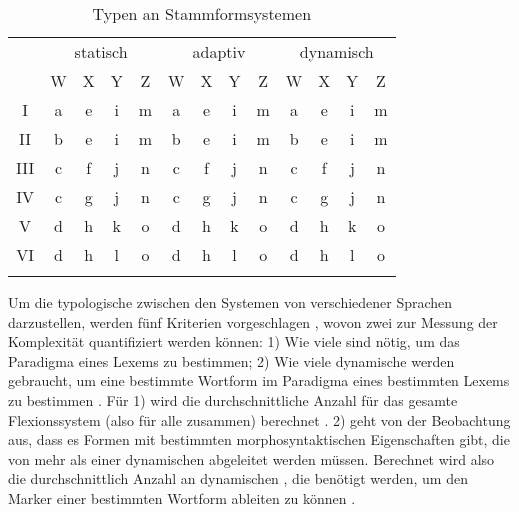 \begin{exe}
\begin{exe}
\begin{description}
\begin{table}
\caption{Typen an Stammformsystemen \citep[2-4]{FinkelStump2007}}\label{table4.14}
\begin{tabular}{*{13}{c}}
\lsptoprule
& \multicolumn{4}{c}{statisch} & \multicolumn{4}{c}{adaptiv} & \multicolumn{4}{c}{dynamisch}\\\cmidrule(lr){2-5}\cmidrule(lr){6-9}\cmidrule(lr){10-13}
& W & X & Y & Z & W & X & Y & Z & W & X & Y & Z\\\midrule
I & \cellcolor[gray]{0.9}a & \cellcolor[gray]{0.9}e & \cellcolor[gray]{0.9}i & m & \cellcolor[gray]{0.9}a & e & i & m & \cellcolor[gray]{0.9}a & e & i & m\\
\midrule
II & \cellcolor[gray]{0.9}b & \cellcolor[gray]{0.9}e & \cellcolor[gray]{0.9}i & m & \cellcolor[gray]{0.9}b & e & i & m & \cellcolor[gray]{0.9}b & e & i & m\\
\midrule
III & \cellcolor[gray]{0.9}c & \cellcolor[gray]{0.9}f & \cellcolor[gray]{0.9}j & n & \cellcolor[gray]{0.9}c & \cellcolor[gray]{0.9}f & j & n & c & \cellcolor[gray]{0.9}f & j & n\\
\midrule
IV & \cellcolor[gray]{0.9}c & \cellcolor[gray]{0.9}g & \cellcolor[gray]{0.9}j & n & \cellcolor[gray]{0.9}c & \cellcolor[gray]{0.9}g & j & n & c & \cellcolor[gray]{0.9}g & j & n\\
\midrule
V & \cellcolor[gray]{0.9}d & \cellcolor[gray]{0.9}h & \cellcolor[gray]{0.9}k & o & \cellcolor[gray]{0.9}d & h & \cellcolor[gray]{0.9}k & o & d & h & \cellcolor[gray]{0.9}k & o\\
\midrule
VI & \cellcolor[gray]{0.9}d & \cellcolor[gray]{0.9}h & \cellcolor[gray]{0.9}l & o & \cellcolor[gray]{0.9}d & h & \cellcolor[gray]{0.9}l & o & d & h & \cellcolor[gray]{0.9}l & o\\
\lspbottomrule
\end{tabular}
\end{table}

Um die typologische  zwischen den Systemen von  verschiedener Sprachen darzustellen, werden fünf Kriterien vorgeschlagen \citep[9]{FinkelStump2007}, wovon zwei zur Messung der Komplexität quantifiziert werden können: 1) Wie viele  sind nötig, um das Paradigma eines Lexems zu bestimmen; 2) Wie viele dynamische  werden gebraucht, um eine bestimmte Wortform im Paradigma eines bestimmten Lexems zu bestimmen \citep[9, 16]{FinkelStump2007}. Für 1) wird die durchschnittliche Anzahl  für das gesamte Flexionssystem (also für alle  zusammen) berechnet \citep[11]{FinkelStump2007}. 2) geht von der Beobachtung aus, dass es Formen mit bestimmten morphosyntaktischen Eigenschaften gibt, die von mehr als einer dynamischen  abgeleitet werden müssen. Berechnet wird also die durchschnittlich Anzahl an dynamischen , die benötigt werden, um den Marker einer bestimmten Wortform ableiten zu können \citep[18]{FinkelStump2007}.


\end{description}
\end{exe}
\end{exe}
